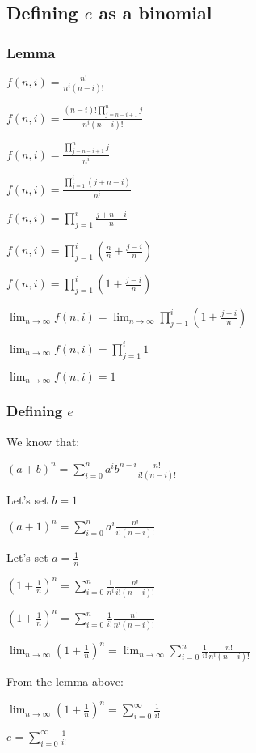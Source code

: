 
\subsection{Defining \(e\) as a binomial}

\subsubsection{Lemma}

\(f(n,i)=\frac{n!}{n^i(n-i)!}\)

\(f(n,i)=\frac{(n-i)!\prod_{j=n-i+1}^nj}{n^i(n-i)!}\)

\(f(n,i)=\frac{\prod_{j=n-i+1}^nj}{n^i}\)

\(f(n,i)=\frac{\prod_{j=1}^i(j+n-i)}{n^i}\)

\(f(n,i)=\prod_{j=1}^i\frac{j+n-i}{n}\)

\(f(n,i)=\prod_{j=1}^i(\frac{n}{n}+\frac{j-i}{n})\)

\(f(n,i)=\prod_{j=1}^i(1+\frac{j-i}{n})\)

\(\lim_{n\rightarrow \infty }f(n,i)=\lim_{n\rightarrow \infty }\prod_{j=1}^i(1+\frac{j-i}{n})\)

\(\lim_{n\rightarrow \infty }f(n,i)=\prod_{j=1}^i1\)

\(\lim_{n\rightarrow \infty }f(n,i)=1\)

\subsubsection{Defining \(e\)}

We know that:

\((a+b)^n=\sum^n_{i=0} a^i b^{n-i} \frac{n!}{i!(n-i)!}\)

Let's set \(b=1\)

\((a+1)^n=\sum^n_{i=0} a^i \frac{n!}{i!(n-i)!}\)

Let's set \(a=\frac{1}{n}\)

\((1+\frac{1}{n})^{n}=\sum^{n}_{i=0} \frac{1}{n^i} \frac{n!}{i!(n-i)!}\)

\((1+\frac{1}{n})^{n}=\sum^{n}_{i=0} \frac{1}{i!} \frac{n!}{n^i(n-i)!}\)

\(\lim_{n\rightarrow \infty }(1+\frac{1}{n})^{n}=\lim_{n\rightarrow \infty }\sum^{n}_{i=0} \frac{1}{i!} \frac{n!}{n^i(n-i)!}\)

From the lemma above:

\(\lim_{n\rightarrow \infty }(1+\frac{1}{n})^{n}=\sum^{\infty }_{i=0} \frac{1}{i!}\)

\(e=\sum^{\infty }_{i=0} \frac{1}{i!}\)

